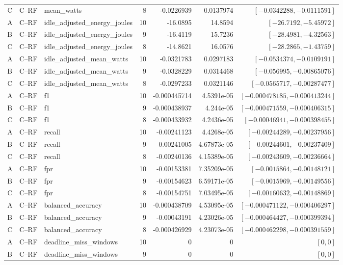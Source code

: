 \begin{longtable}{lllrrrr}
C & C--RF & mean\_watts & 8 & -0.0226939 & 0.0137974 & $[-0.0342288,-0.0111591]$\\
A & C--RF & idle\_adjusted\_energy\_joules & 10 & -16.0895 & 14.8594 & $[-26.7192,-5.45972]$\\
B & C--RF & idle\_adjusted\_energy\_joules & 9 & -16.4119 & 15.7236 & $[-28.4981,-4.32563]$\\
C & C--RF & idle\_adjusted\_energy\_joules & 8 & -14.8621 & 16.0576 & $[-28.2865,-1.43759]$\\
A & C--RF & idle\_adjusted\_mean\_watts & 10 & -0.0321783 & 0.0297183 & $[-0.0534374,-0.0109191]$\\
B & C--RF & idle\_adjusted\_mean\_watts & 9 & -0.0328229 & 0.0314468 & $[-0.056995,-0.00865076]$\\
C & C--RF & idle\_adjusted\_mean\_watts & 8 & -0.0297233 & 0.0321146 & $[-0.0565717,-0.00287477]$\\
A & C--RF & f1 & 10 & -0.000445714 & 4.5391e-05 & $[-0.000478185,-0.000413244]$\\
B & C--RF & f1 & 9 & -0.000438937 & 4.244e-05 & $[-0.000471559,-0.000406315]$\\
C & C--RF & f1 & 8 & -0.000433932 & 4.2436e-05 & $[-0.00046941,-0.000398455]$\\
A & C--RF & recall & 10 & -0.00241123 & 4.4268e-05 & $[-0.00244289,-0.00237956]$\\
B & C--RF & recall & 9 & -0.00241005 & 4.67873e-05 & $[-0.00244601,-0.00237409]$\\
C & C--RF & recall & 8 & -0.00240136 & 4.15389e-05 & $[-0.00243609,-0.00236664]$\\
A & C--RF & fpr & 10 & -0.00153381 & 7.35209e-05 & $[-0.0015864,-0.00148121]$\\
B & C--RF & fpr & 9 & -0.00154623 & 6.59171e-05 & $[-0.0015969,-0.00149556]$\\
C & C--RF & fpr & 8 & -0.00154751 & 7.03495e-05 & $[-0.00160632,-0.00148869]$\\
A & C--RF & balanced\_accuracy & 10 & -0.000438709 & 4.53095e-05 & $[-0.000471122,-0.000406297]$\\
B & C--RF & balanced\_accuracy & 9 & -0.00043191 & 4.23026e-05 & $[-0.000464427,-0.000399394]$\\
C & C--RF & balanced\_accuracy & 8 & -0.000426929 & 4.23073e-05 & $[-0.000462298,-0.000391559]$\\
A & C--RF & deadline\_miss\_windows & 10 & 0 & 0 & $[0,0]$\\
B & C--RF & deadline\_miss\_windows & 9 & 0 & 0 & $[0,0]$\\

\end{longtable}
